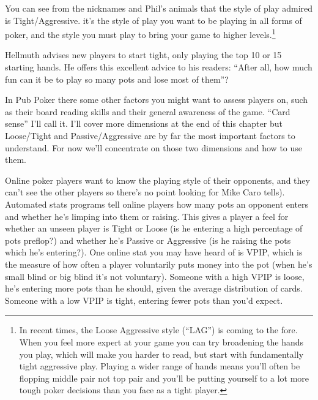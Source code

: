 
You can see from the nicknames and Phil's animals that the style
of play admired is Tight/Aggressive. it's the style of play you want
to be playing in all forms of poker, and the style you must play to
bring your game to higher
levels.\footnote{In recent times, the Loose Aggressive style
(``LAG'') is coming to the fore. When you feel more expert
at your game you can try broadening the hands you play, which
will make you harder to read, but start with fundamentally
tight aggressive play. Playing a wider range of hands means you'll
often be flopping middle pair not top pair and you'll be putting
yourself to a lot more tough poker decisions than you face as a tight
player.}

Hellmuth advises new players to start tight, only playing the
top 10 or 15 starting hands. He offers this excellent
advice to his readers: ``After all, how much fun can it be to
play so many pots and lose most of them''?

In Pub Poker there some other factors you might want to assess
players on, such as their board reading skills and their general
awareness of the game. ``Card sense'' I'll call it.  I'll cover more
dimensions at the end of this chapter but Loose/Tight and
Passive/Aggressive are by far the most important factors to
understand. For now we'll concentrate on those
two dimensions and how to use them.

Online poker players want to know the playing style of their
opponents, and they can't see the other players so there's no point
looking for Mike Caro tells). Automated stats programs tell online
players how many pots an opponent enters and whether he's limping into
them or raising. This gives a player a feel for whether an unseen
player is Tight or Loose (is he entering a high percentage of pots
preflop?) and whether he's Passive or Aggressive (is he raising the
pots which he's entering?). One online stat you may have heard of is
VPIP, which is the measure of how often a player voluntarily puts
money into the pot (when he's small blind or big blind it's not
voluntary). Someone with a high VPIP is loose, he's entering more pots
than he should, given the average distribution of cards. Someone with
a low VPIP is tight, entering fewer pots than you'd expect.

